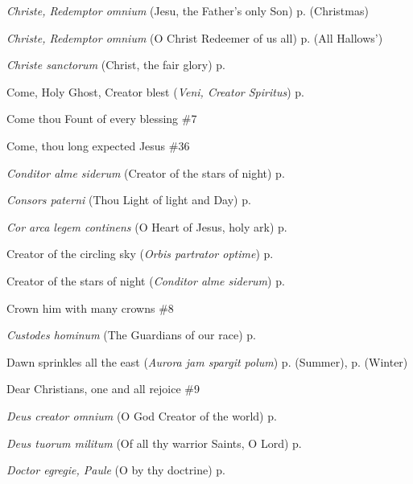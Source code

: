 \begin{hangparas}{1.25em}{1}
\par\noindent
\textit{Christe, Redemptor omnium} (Jesu, the Father's only Son) \dotfill p. \pageref{ChristmasEvensong} (Christmas)
\par\noindent
\textit{Christe, Redemptor omnium} (O Christ Redeemer of us all) \dotfill p. \pageref{AllHallowsEvensong} (All Hallows')
\par\noindent
\textit{Christe sanctorum} (Christ, the fair glory) \dotfill p. \pageref{MichaelMattins}
\par\noindent
Come, Holy Ghost, Creator blest (\textit{Veni, Creator Spiritus}) \dotfill p. \pageref{WhitsundayEvensong}
\par\noindent
Come thou Fount of every blessing \dotfill \#7
\par\noindent
Come, thou long expected Jesus \dotfill \#36
\par\noindent
\textit{Conditor alme siderum} (Creator of the stars of night) \dotfill p. \pageref{FirstAdventEvensong}
\par\noindent
\textit{Consors paterni} (Thou Light of light and Day) \dotfill p. \pageref{TuesdayInvitatory}
\par\noindent
\textit{Cor arca legem continens} (O Heart of Jesus, holy ark) \dotfill p. \pageref{CompassionMattins}
\par\noindent
Creator of the circling sky (\textit{Orbis partrator optime}) \dotfill p. \pageref{GuardianAngelsMattins}
\par\noindent
Creator of the stars of night (\textit{Conditor alme siderum}) \dotfill p. \pageref{FirstAdventEvensong}
\par\noindent
Crown him with many crowns \dotfill \#8
\par\noindent
\textit{Custodes hominum} (The Guardians of our race) \dotfill p. \pageref{GuardianAngelsEvensong}
\par\noindent
Dawn sprinkles all the east (\textit{Aurora jam spargit polum}) \dotfill p. \pageref{SaturdayMattinsSummer} (Summer), p. \pageref{SaturdayMattinsWinter} (Winter)
\par\noindent
Dear Christians, one and all rejoice \dotfill \#9
\par\noindent
\textit{Deus creator omnium} (O God Creator of the world) \dotfill p. \pageref{WeekdayInvitatory}
\par\noindent
\textit{Deus tuorum militum} (Of all thy warrior Saints, O Lord) \dotfill p. \pageref{StephenEvensong}
\par\noindent
\textit{Doctor egregie, Paule} (O by thy doctrine) \dotfill p. \pageref{PaulEvensong}

\end{hangparas}
